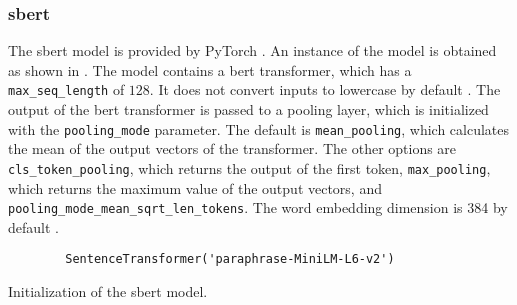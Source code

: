 \subsubsection*{\ac{sbert}}\label{subsubsec:impl-sbert}

The \ac{sbert} model is provided by PyTorch \cite{HfsentTrans2019}.
An instance of the model is obtained as shown in .
The model contains a \ac{bert} transformer, which has a \texttt{max\_seq\_length} of $128$. 
It does not convert inputs to lowercase by default \cite{sbert-dev}.
The output of the \ac{bert} transformer is passed to a pooling layer, which is initialized with the \texttt{pooling\_mode} parameter.
The default is \texttt{mean\_pooling}, which calculates the mean of the output vectors of the transformer.
The other options are \texttt{cls\_token\_pooling}, which returns the output of the first token, 
\texttt{max\_pooling}, which returns the maximum value of the output vectors,
and \texttt{pooling\_mode\_mean\_sqrt\_len\_tokens}.
The word embedding dimension is 384 by default \cite{sbert-dev}.

\begin{listing}[htp]
    \begin{verbatim}
        SentenceTransformer('paraphrase-MiniLM-L6-v2')
    \end{verbatim}
    \caption[Initialization of the \ac{sbert} model]{Initialization of the \ac{sbert} model.
    }
    \label{lst:impl-sbert}
\end{listing}